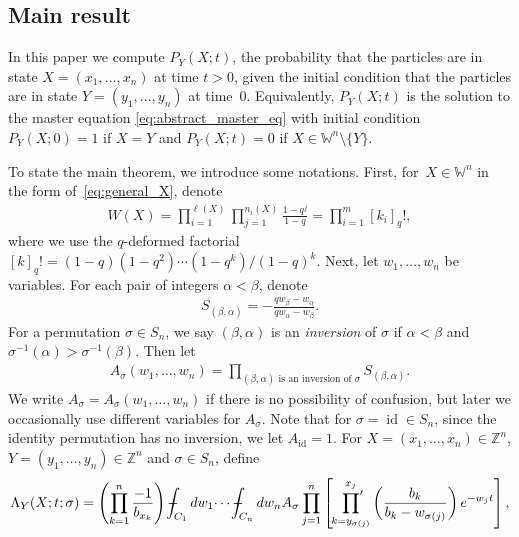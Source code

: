 \documentclass[pdftex]{sigma}
\numberwithin{equation}{section}
\def\Xint#1{\mathchoice
{\XXint\displaystyle\textstyle{#1}}%
{\XXint\textstyle\scriptstyle{#1}}%
{\XXint\scriptstyle\scriptscriptstyle{#1}}%
{\XXint\scriptscriptstyle\scriptscriptstyle{#1}}%
\!\int}
\def\XXint#1#2#3{{\setbox0=\hbox{$#1{#2#3}{\int}$}
\vcenter{\hbox{$#2#3$}}\kern-.5\wd0}}
\def\dashint{\Xint-}
\newcommand{\intZ}{\mathbb{Z}}
\newcommand{\prodprime}{\sideset{}{'}\prod}
\newcommand{\Weylchamber}{\mathbb{W}}
\DeclareMathOperator{\id}{id}
\begin{document}
\subsection{Main result}

In this paper we compute $P_Y(X; t)$, the probability that the particles are in state $X \!= \! (x_1, \dotsc, x_n)$ at time $t > 0$, given the initial condition that the particles are in state $Y = (y_1, \dotsc, y_n)$ at time~$0$. Equivalently, $P_Y(X; t)$ is the solution to the master equation \eqref{eq:abstract_master_eq} with initial condition $P_Y(X; 0) = 1$ if $X = Y$ and $P_Y(X; t) = 0$ if $X \in \Weylchamber^n {\setminus} \{ Y \}$.

To state the main theorem, we introduce some notations. First, for~$X \in \Weylchamber^n$ in the form of~\eqref{eq:general_X}, denote
\begin{gather*}
 W(X) = \prod^{\ell(X)}_{i = 1} \prod^{n_i(X)}_{j = 1} \frac{1 - q^j}{1 - q} = \prod^m_{i = 1} [k_i]_q!,
\end{gather*}
where we use the $q$-deformed factorial $[k]_q! = (1 - q)(1 - q^2) \dotsb (1 - q^k)/(1 - q)^k$. Next, let $w_1, \dotsc, w_n$ be variables. For each pair of integers $\alpha < \beta$, denote
\begin{gather*}
 S_{(\beta, \alpha)} = -\frac{q w_{\beta} - w_{\alpha}}{q w_{\alpha} - w_{\beta}}.
\end{gather*}
For a permutation $\sigma \in S_n$, we say $(\beta, \alpha)$ is an \emph{inversion} of $\sigma$ if $\alpha < \beta$ and $\sigma^{-1}(\alpha) > \sigma^{-1}(\beta)$. Then let
\begin{gather*}
 A_{\sigma}(w_1, \dotsc, w_n) = \prod_{(\beta, \alpha) \text{ is an inversion of } \sigma} S_{(\beta, \alpha)}.
\end{gather*}
We write $A_{\sigma} = A_{\sigma}(w_1, \dotsc, w_n)$ if there is no possibility of confusion, but later we occasionally use dif\/ferent variables for $A_{\sigma}$. Note that for $\sigma = \id \in S_n$, since the identity permutation has no inversion, we let $A_{\id} = 1$. For $X = (x_1, \dotsc, x_n) \in \intZ^n$, $Y = (y_1, \dotsc, y_n) \in \intZ^n$ and $\sigma \in S_n$, def\/ine
\begin{gather} \label{eq:integral_Lambda}
 \Lambda_Y(X; t; \sigma) = \left( \prod^n_{k = 1} \frac{-1}{b_{x_k}} \right) \dashint_{C_1} dw_1 \dotsi \dashint_{C_n} dw_n A_{\sigma} \prod^n_{j = 1} \left[ \prodprime^{x_j}_{k = y_{\sigma(j)}} \left( \frac{b_k}{b_k - w_{\sigma(j)}} \right) e^{-w_j t} \right],
\end{gather}
\end{document}
